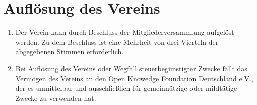 \documentclass[12pt,a4paper,draft]{article}
\begin{document}
\section{Auflösung des Vereins}
\begin{enumerate}
\item Der Verein kann durch Beschluss der Mitgliederversammlung aufgelöst 
werden. Zu dem Beschluss ist eine Mehrheit von drei Vierteln der abgegebenen 
Stimmen erforderlich. %

\item Bei Auflösung des Vereins oder Wegfall steuerbegünstigter Zwecke fällt 
das Vermögen des Vereins an den Open Knowedge Foundation Deutschland e.V., der 
es unmittelbar und ausschließlich für gemeinnützige oder mildtätige Zwecke zu 
verwenden hat. %
\end{enumerate}
\end{document}
